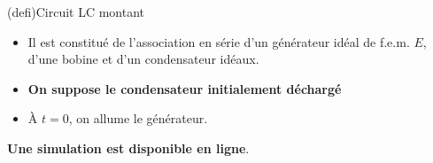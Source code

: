 \documentclass[../../main/main.tex]{subfiles}
\begin{document}
\begin{tcb*}[sidebyside, righthand ratio=.30](defi){Circuit LC montant}
	\begin{itemize}
		\item Il est constitué de l'association en série d'un générateur idéal de
		      f.e.m. $E$, d'une bobine et d'un condensateur idéaux.
		\item \textbf{On suppose le condensateur initialement déchargé}
		\item À $t=0$, on allume le générateur.
	\end{itemize}
	\textbf{Une simulation est disponible en
		ligne}.
	\tcblower
	\begin{center}
	\end{center}
\end{tcb*}
\end{document}
